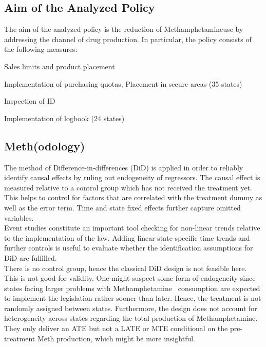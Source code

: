 \documentclass[%
  fontsize=11pt, %
  version=last,%
  headsepline,
  titlepage = false,
  DIV = 11, %
  abstract = false
]{scrartcl}
\newcommand{\meth}{Methamphetamine} %
\begin{document}
\subsection*{Aim of the Analyzed Policy}
The aim of the analyzed policy is the reduction of \meth use by addressing the channel of drug production. In particular, the policy consists of the following measures:
\begin{itemize*}
	\item Sales limits and product placement
	\item Implementation of purchasing quotas, Placement in secure areas (35 states)
	\item Inspection of ID
	\item Implementation of logbook (24 states)
\end{itemize*}

\subsection*{Meth(odology)}
The method of Difference-in-differences (DiD) is applied in order to reliably identify causal effects by ruling out endogeneity of regressors. The causal effect is measured relative to a control group which has not received the treatment yet. This helps to control for factors that are correlated with the treatment dummy as well as the error term. Time and state fixed effects further capture omitted variables. 
\\ Event studies constitute an important tool checking for non-linear trends relative to the implementation of the law. Adding linear state-specific time trends and further controls is useful to evaluate whether the identification assumptions for DiD are fulfilled.\\
There is no control group, hence the classical DiD design is not feasible here. This is not good for validity. One might suspect some form of endogeneity since states facing larger problems with \meth~ consumption are expected to implement the legislation rather sooner than later. Hence, the treatment is not randomly assigned between states. Furthermore, the design does not account for heterogeneity across states regarding the total production of \meth. They only deliver an ATE but not a LATE or MTE conditional on the pre-treatment Meth production, which might be more insightful.\\
\end{document}
